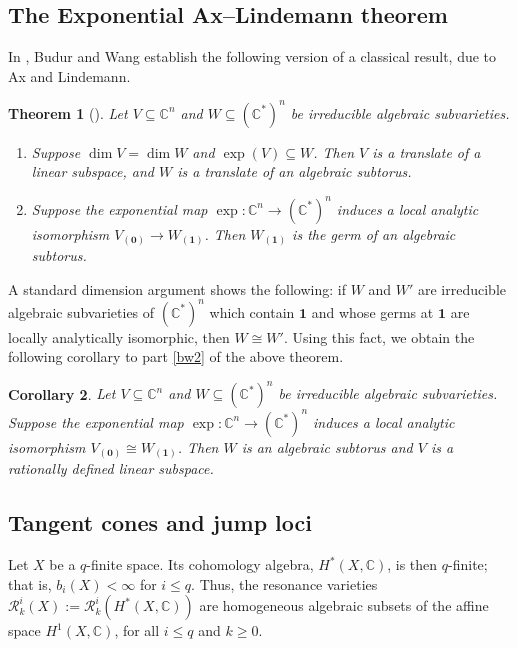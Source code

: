 \documentclass{article}
\numberwithin{equation}{section}
\newtheorem{theorem}{Theorem}[section]
\newtheorem{corollary}[theorem]{Corollary}
\theoremstyle{definition}
\renewcommand{\C}{\mathbb{C}}
\newcommand{\RR}{\mathcal{R}}
\newcommand{\one}{\mathbf{1}}
\newcommand{\zero}{\mathbf{0}}
\begin{document}
\subsection{The Exponential Ax--Lindemann theorem}
\label{subsec:ax}

In \cite{BW20}, Budur and Wang establish the following version 
of a classical result, due to Ax and Lindemann.

\begin{theorem}[\cite{BW20}]
\label{thm:ax}
Let $V\subseteq \C^n$ and $W\subseteq (\C^*)^n$ be 
irreducible algebraic subvarieties.
\begin{enumerate}
\item \label{bw1}
Suppose $\dim V=\dim W$ and $\exp(V)\subseteq W$.  Then $V$ is a translate 
of a linear subspace, and $W$ is a translate of an algebraic subtorus. 
\item \label{bw2}
Suppose the exponential map $\exp\colon \C^n \to (\C^*)^n$ induces a 
local analytic isomorphism  $V_{(\zero)} \to W_{(\one)}$. Then  
$W_{(\one)}$ is the germ of an algebraic subtorus. 
\end{enumerate}
\end{theorem}

A standard dimension argument shows the following: 
if $W$ and $W'$ are irreducible algebraic subvarieties of 
$(\C^*)^n$ which contain $\one$ and whose germs at 
$\one$ are locally analytically isomorphic, then $W\cong W'$.  
Using this fact, we obtain the following corollary to part \eqref{bw2} of 
the above theorem.

\begin{corollary}
\label{cor:ax-bis}
Let $V\subseteq \C^n$ and $W\subseteq (\C^*)^n$ be irreducible 
algebraic subvarieties.  Suppose the exponential map 
$\exp\colon \C^n \to (\C^*)^n$ induces a local analytic 
isomorphism $V_{(\zero)} \cong W_{(\one)}$. Then $W$ is 
an algebraic subtorus and $V$ is a rationally defined 
linear subspace.
\end{corollary}

\subsection{Tangent cones and jump loci}
\label{subsec:tcone thm}

Let $X$ be a $q$-finite space. Its cohomology algebra, 
$H^{*}(X,\C)$, is then $q$-finite; that is, $b_i(X)<\infty$ for $i\le q$. 
Thus, the resonance varieties $\RR^i_k(X):=\RR^i_k(H^{*}(X,\C))$ 
are homogeneous algebraic subsets of the affine space $H^{1}(X,\C)$, 
for all $i\le q$ and $k\ge 0$.  
\end{document}
